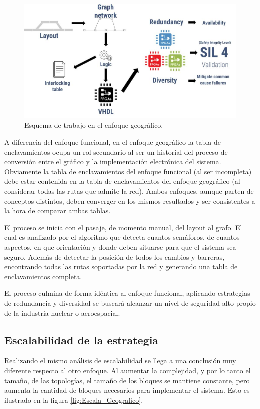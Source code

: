 		\begin{figure}[h]
		\centering
			\includegraphics[scale=.4]{./Figures/Geografico_workflow}
			\caption{Esquema de trabajo en el enfoque geográfico.}
			\label{fig:Work_Geografico}
		\end{figure}
	
		A diferencia del enfoque funcional, en el enfoque geográfico la tabla de enclavamientos ocupa un rol secundario al ser un historial del proceso de conversión entre el gráfico y la implementación electrónica del sistema. Obviamente la tabla de enclavamientos del enfoque funcional (al ser incompleta) debe estar contenida en la tabla de enclavamientos del enfoque geográfico (al considerar todas las rutas que admite la red). Ambos enfoques, aunque parten de conceptos distintos, deben converger en los mismos resultados y ser consistentes a la hora de comparar ambas tablas.
		
		El proceso se inicia con el pasaje, de momento manual, del layout al grafo. El cual es analizado por el algoritmo que detecta cuantos semáforos, de cuantos aspectos, en que orientación y donde deben situarse para que el sistema sea seguro. Además de detectar la posición de todos los cambios y barreras, encontrando todas las rutas soportadas por la red y generando una tabla de enclavamientos completa.
		
		El proceso culmina de forma idéntica al enfoque funcional, aplicando estrategias de redundancia y diversidad se buscará alcanzar un nivel de seguridad alto propio de la industria nuclear o aeroespacial.
		
		\subsection{Escalabilidad de la estrategia}	
			
			Realizando el mismo análisis de escalabilidad se llega a una conclusión muy diferente respecto al otro enfoque. Al aumentar la complejidad, y por lo tanto el tamaño, de las topologías, el tamaño de los bloques se mantiene constante, pero aumenta la cantidad de bloques necesarios para implementar el sistema. Esto es ilustrado en la figura \ref{fig:Escala_Geografico}.
					

